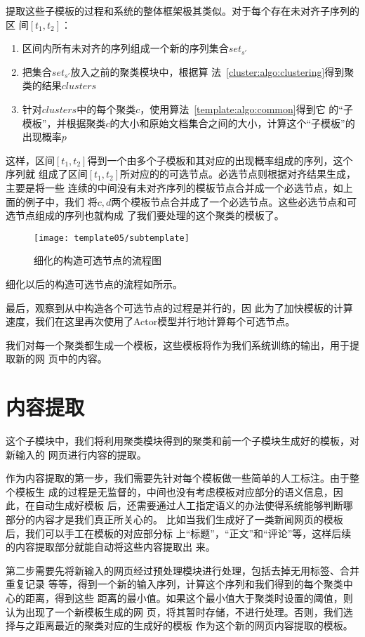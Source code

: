 提取这些子模板的过程和系统的整体框架极其类似。对于每个存在未对齐子序列的区
间$[t_1,t_2]$：
\begin{enumerate}
\item 区间内所有未对齐的序列组成一个新的序列集合$set_{s'}$
\item 把集合$set_{s'}$放入之前的聚类模块中，根据算
  法~\ref{cluster:algo:clustering}得到聚类的结果$clusters$
\item 针对$clusters$中的每个聚类$c$，使用算法~\ref{template:algo:common}得到它
  的“子模板”，并根据聚类$c$的大小和原始文档集合之间的大小，计算这个“子模板”的
  出现概率$p$
\end{enumerate}

这样，区间$[t_1,t_2]$得到一个由多个子模板和其对应的出现概率组成的序列，这个序列就
组成了区间$[t_1,t_2]$所对应的的可选节点。必选节点则根据对齐结果生成，主要是将一些
连续的中间没有未对齐序列的模板节点合并成一个必选节点，如上面的例子中，我们
将$c,d$两个模板节点合并成了一个必选节点。这些必选节点和可选节点组成的序列也就构成
了我们要处理的这个聚类的模板了。
\begin{figure}
  \centering
  \texttt{[image: template05/subtemplate]}
  \caption{细化的构造可选节点的流程图}
  \label{template:fig:subtemplate}
\end{figure}

细化以后的构造可选节点的流程如所示。

最后，观察到从中构造各个可选节点的过程是并行的，因
此为了加快模板的计算速度，我们在这里再次使用了Actor模型并行地计算每个可选节点。

我们对每一个聚类都生成一个模板，这些模板将作为我们系统训练的输出，用于提取新的网
页中的内容。
\section{内容提取}
\label{sec:extraction}
这个子模块中，我们将利用聚类模块得到的聚类和前一个子模块生成好的模板，对新输入的
网页进行内容的提取。

作为内容提取的第一步，我们需要先针对每个模板做一些简单的人工标注。由于整个模板生
成的过程是无监督的，中间也没有考虑模板对应部分的语义信息，因此，在自动生成好模板
后，还需要通过人工指定语义的办法使得系统能够判断哪部分的内容才是我们真正所关心的。
比如当我们生成好了一类新闻网页的模板后，我们可以手工在模板的对应部分标
上“标题”，“正文”和“评论”等，这样后续的内容提取部分就能自动将这些内容提取出
来。

第二步需要先将新输入的网页经过预处理模块进行处理，包括去掉无用标签、合并重复记录
等等，得到一个新的输入序列，计算这个序列和我们得到的每个聚类中心的距离，得到这些
距离的最小值。如果这个最小值大于聚类时设置的阈值，则认为出现了一个新模板生成的网
页，将其暂时存储，不进行处理。否则，我们选择与之距离最近的聚类对应的生成好的模板
作为这个新的网页内容提取的模板。

